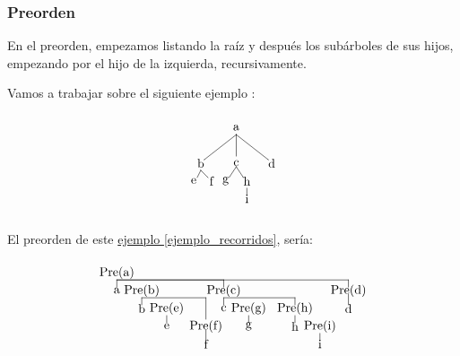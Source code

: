 \documentclass[10pt,a4paper,spanish]{report}
\begin{document}
\subsubsection{\textcolor[rgb]{0.3,0.4,0.8}Preorden}
\noindent
En el preorden, empezamos listando la raíz y después los subárboles de sus hijos, empezando por el hijo de la izquierda, recursivamente.

\noindent
Vamos a trabajar sobre el siguiente ejemplo \label{ejemplo_recorridos}:
\[\begin{xy}
,(0,0)*+=<10mm>[]\txt<2cm>{a}
,(-10,-10)*+=<10mm>[]\txt<2cm>{b}
,(0,-10)*+=<10mm>[]\txt<2cm>{c}
,(10,-10)*+=<10mm>[]\txt<2cm>{d}
,(-12,-15)*+=<10mm>[]\txt<2cm>{e}
,(-7,-15)*+=<10mm>[]\txt<2cm>{f}
,(-3,-15)*+=<10mm>[]\txt<2cm>{g}
,(3,-15)*+=<10mm>[]\txt<2cm>{h}
,(3,-20)*+=<10mm>[]\txt<2cm>{i}

\ar@{-} (0,-2);(-9,-9)
\ar@{-} (0,-2);(0,-8)
\ar@{-} (0,-2);(9,-9)
\ar@{-} (-10,-12);(-11,-14)
\ar@{-} (-10,-12);(-8,-14)
\ar@{-} (0,-11);(-2,-14)
\ar@{-} (0,-11);(2,-14)
\ar@{-} (3,-17);(3,-19)
\end{xy}\]

\noindent
El preorden de este \hyperref[ejemplo_recorridos]{ejemplo \ref*{ejemplo_recorridos}}, sería:
\[\begin{xy}
,(0,0)*+=<10mm>[]\txt<2cm>{Pre(a)}
,(0,-5)*+=<10mm>[]\txt<2cm>{a}
,(7,-5)*+=<10mm>[]\txt<2cm>{Pre(b)}
,(7,-10)*+=<10mm>[]\txt<2cm>{b}
,(14,-10)*+=<10mm>[]\txt<2cm>{Pre(e)}
,(14,-15)*+=<10mm>[]\txt<2cm>{e}
,(25,-15)*+=<10mm>[]\txt<2cm>{Pre(f)}
,(25,-20)*+=<10mm>[]\txt<2cm>{f}
,(30,-5)*+=<10mm>[]\txt<2cm>{Pre(c)}
,(30,-10)*+=<10mm>[]\txt<2cm>{c}
,(37,-10)*+=<10mm>[]\txt<2cm>{Pre(g)}
,(37,-15)*+=<10mm>[]\txt<2cm>{g}
,(50,-10)*+=<10mm>[]\txt<2cm>{Pre(h)}
,(50,-15)*+=<10mm>[]\txt<2cm>{h}
,(57,-15)*+=<10mm>[]\txt<2cm>{Pre(i)}
,(57,-20)*+=<10mm>[]\txt<2cm>{i}
,(65,-5)*+=<10mm>[]\txt<2cm>{Pre(d)}
,(65,-10)*+=<10mm>[]\txt<2cm>{d}

\ar@{-} (0,-2);(0,-4)
\ar@{-} (7,-7);(7,-9)
\ar@{-} (14,-12);(14,-14)
\ar@{-} (7,-7);(25,-7)
\ar@{-} (25,-7);(25,-13)
\ar@{-} (25,-16);(25,-19)
\ar@{-} (0,-2);(30,-2)
\ar@{-} (30,-2);(30,-4)
\ar@{-} (30,-7);(30,-9)
\ar@{-} (37,-12);(37,-14)
\ar@{-} (30,-7);(50,-7)
\ar@{-} (50,-7);(50,-9)
\ar@{-} (50,-12);(50,-14)
\ar@{-} (57,-17);(57,-19)
\ar@{-} (0,-2);(65,-2)
\ar@{-} (65,-2);(65,-4)
\ar@{-} (65,-6);(65,-9)
\end{xy}\]
\end{document}
